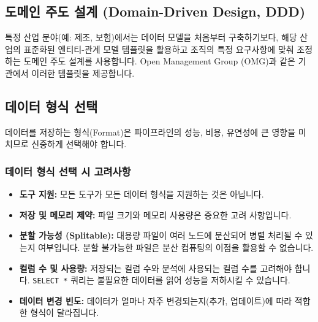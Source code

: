 \documentclass[11pt,a4paper]{article}
\theoremstyle{definition}
\newcommand{\code}[1]{\texttt{#1}}
\begin{document}
\subsection{도메인 주도 설계 (Domain-Driven Design, DDD)}
특정 산업 분야(예: 제조, 보험)에서는 데이터 모델을 처음부터 구축하기보다, 해당 산업의 표준화된 엔티티-관계 모델 템플릿을 활용하고 조직의 특정 요구사항에 맞춰 조정하는 도메인 주도 설계를 사용합니다. Open Management Group (OMG)과 같은 기관에서 이러한 템플릿을 제공합니다.

\subsection{데이터 형식 선택}
데이터를 저장하는 형식(Format)은 파이프라인의 성능, 비용, 유연성에 큰 영향을 미치므로 신중하게 선택해야 합니다.

\subsubsection{데이터 형식 선택 시 고려사항}
\begin{itemize}
    \item \textbf{도구 지원:} 모든 도구가 모든 데이터 형식을 지원하는 것은 아닙니다.
    \item \textbf{저장 및 메모리 제약:} 파일 크기와 메모리 사용량은 중요한 고려 사항입니다.
    \item \textbf{분할 가능성 (Splitable):} 대용량 파일이 여러 노드에 분산되어 병렬 처리될 수 있는지 여부입니다. 분할 불가능한 파일은 분산 컴퓨팅의 이점을 활용할 수 없습니다.
    \item \textbf{컬럼 수 및 사용량:} 저장되는 컬럼 수와 분석에 사용되는 컬럼 수를 고려해야 합니다. \code{SELECT *} 쿼리는 불필요한 데이터를 읽어 성능을 저하시킬 수 있습니다.
    \item \textbf{데이터 변경 빈도:} 데이터가 얼마나 자주 변경되는지(추가, 업데이트)에 따라 적합한 형식이 달라집니다.
\end{itemize}
\end{document}
